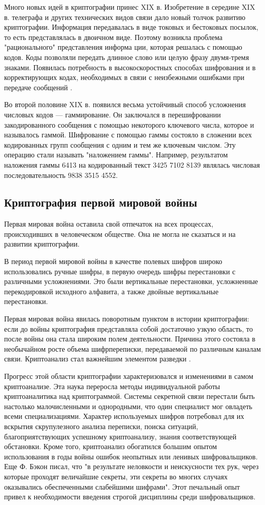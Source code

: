 Много новых идей в криптографии принес XIX в. Изобретение в середине XIX в. телеграфа и других технических видов связи дало новый толчок развитию криптографии. Информация передавалась в виде токовых и бестоковых посылок, то есть представлялась в двоичном виде. Поэтому возникла проблема "рационального" представления информа ции, которая решалась с помощью кодов. Коды позволяли передать длинное слово или целую фразу двумя-тремя знаками. Появилась потребность в высокоскоростных способах шифрования и в корректирующих кодах, необходимых в связи с неизбежными ошибками при передаче сообщений \cite{omran2011cryptanalytic}.

Во второй половине XIX в. появился весьма устойчивый способ усложнения числовых кодов — гаммирование. Он заключался в перешифровании закодированного сообщения с помощью некоторого ключевого числа, которое и называлось гаммой. Шифрование с помощью гаммы состояло в сложении всех кодированных групп сообщения с одним и тем же ключевым числом. Эту операцию стали называть "наложением гаммы". Например, результатом наложения гаммы 6413 на кодированный текст 3425 7102 8139 являлась числовая последовательность 9838 3515 4552.


\subsection{Криптография первой мировой войны}
Первая мировая война оставила свой отпечаток на всех процессах, происходивших в человеческом обществе. Она не могла не сказаться и на развитии криптографии.

В период первой мировой войны в качестве полевых шифров широко использовались ручные шифры, в первую очередь шифры перестановки с различными усложнениями. Это были вертикальные перестановки, усложненные перекодировкой исходного алфавита, а также двойные вертикальные перестановки.

Первая мировая война явилась поворотным пунктом в истории криптографии: если до войны криптография представляла собой достаточно узкую область, то после войны она стала широким полем деятельности. Причина этого состояла в необычайном росте объема шифрпереписки, передаваемой по различным каналам связи. Криптоанализ стал важнейшим элементом разведки \cite{d2006sov}.

Прогресс этой области криптографии характеризовался и изменениями в самом криптоанализе. Эта наука переросла методы индивидуальной работы криптоаналитика над криптограммой. Системы секретной связи перестали быть настолько малочисленными и однородными, что один специалист мог овладеть всеми специализациями. Характер используемых шифров потребовал для их вскрытия скрупулезного анализа переписки, поиска ситуаций, благоприятствующих успешному криптоанализу, знания соответствующей обстановки. Кроме того, криптоанализ обогатился большим опытом использования в годы войны ошибок неопытных или ленивых шифровальщиков. Еще Ф. Бэкон писал, что "в результате неловкости и неискусности тех рук, через которые проходят величайшие секреты, эти секреты во многих случаях оказывались обеспеченными слабейшими шифрами". Этот печальный опыт привел к необходимости введения строгой дисциплины среди шифровальщиков.

